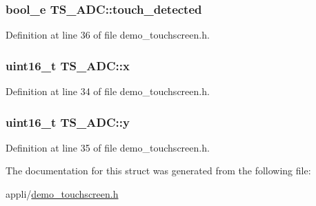 \subsubsection[{touch\+\_\+detected}]{\setlength{\rightskip}{0pt plus 5cm}bool\+\_\+e T\+S\+\_\+\+A\+D\+C\+::touch\+\_\+detected}\label{struct_t_s___a_d_c_a19bcc0c50842ce9f91c3ff70a0379ad9}


Definition at line 36 of file demo\+\_\+touchscreen.\+h.

\hypertarget{struct_t_s___a_d_c_a311aec5e5bdf585b941745fd47c2df7b}{}
\subsubsection[{x}]{\setlength{\rightskip}{0pt plus 5cm}uint16\+\_\+t T\+S\+\_\+\+A\+D\+C\+::x}\label{struct_t_s___a_d_c_a311aec5e5bdf585b941745fd47c2df7b}


Definition at line 34 of file demo\+\_\+touchscreen.\+h.

\hypertarget{struct_t_s___a_d_c_ac7140c8f07941dab74d24d255c5254d3}{}
\subsubsection[{y}]{\setlength{\rightskip}{0pt plus 5cm}uint16\+\_\+t T\+S\+\_\+\+A\+D\+C\+::y}\label{struct_t_s___a_d_c_ac7140c8f07941dab74d24d255c5254d3}


Definition at line 35 of file demo\+\_\+touchscreen.\+h.



The documentation for this struct was generated from the following file\+:\begin{DoxyCompactItemize}
\item 
appli/\hyperlink{demo__touchscreen_8h}{demo\+\_\+touchscreen.\+h}\end{DoxyCompactItemize}
